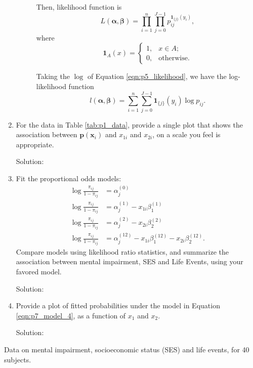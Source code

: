 \documentclass[letterpaper,11pt]{article}
\begin{document}
\begin{enumerate}
\begin{description}
    Then, likelihood function is
    \begin{equation}
      L\left(\bm\alpha, \bm\beta\right)
      = \prod_{i=1}^n \prod_{j=0}^{J-1} p_{ij}^{\mathbf{1}_{\{j\}}\left(y_i\right)},
      \label{eqn:p5_likelihood}
    \end{equation}
    where
    \begin{equation}
      \mathbf{1}_A\left(x\right) = \begin{cases}
        1,&x \in A; \\
        0,&\text{otherwise}.
      \end{cases}
      \label{eqn:p5_indicator}
    \end{equation}

    Taking the $\log$ of Equation \ref{eqn:p5_likelihood}, we have the
    log-likelihood function
    \begin{equation}
      l\left(\bm\alpha,\bm\beta\right)
      = \sum_{i=1}^n\sum_{j=0}^{J-1}\mathbf{1}_{\{j\}}\left(y_i\right) \log p_{ij}.
    \end{equation}    
  \end{description}
\item For the data in Table \ref{tab:p1_data}, provide a single plot that shows
  the association between $\mathbf{p}\left(\mathbf{x}_i\right)$ and $x_{1i}$ and
  $x_{2i}$, on a scale you feel is appropriate.
  \begin{description}
  \item[Solution:] 
  \end{description}
\item Fit the proportional odds models:
  \begin{align}
    \log\frac{\pi_{ij}}{1 - \pi_{ij}}
    &= \alpha_j^{(0)}
      \label{eqn:p7_model_1} \\
    \log\frac{\pi_{ij}}{1 - \pi_{ij}}
    &= \alpha_j^{(1)} - x_{1i}\beta_1^{(1)}
      \label{eqn:p7_model_2} \\
    \log\frac{\pi_{ij}}{1 - \pi_{ij}}
    &=  \alpha_j^{(2)} - x_{2i}\beta_2^{(2)}
      \label{eqn:p7_model_3} \\
    \log\frac{\pi_{ij}}{1 - \pi_{ij}}
    &= \alpha_j^{(12)} - x_{1i}\beta_1^{(12)} - x_{2i}\beta_2^{(12)}.
      \label{eqn:p7_model_4}
  \end{align}
  Compare models using likelihood ratio statistics, and summarize the
  association between mental impairment, SES and Life Events, using your favored
  model.
  
  \begin{description}
  \item[Solution:] 
  \end{description}
\item Provide a plot of fitted probabilities under the model in Equation
  \ref{eqn:p7_model_4}, as a function of $x_1$ and $x_2$.

  \begin{description}
  \item[Solution:] 
  \end{description}
\end{enumerate}
\begin{table}
  \small
  \centering
  
  \caption{Data on mental impairment, socioeconomic status (SES) and life
    events, for 40 subjects.}
  \label{tab:p1_data}
\end{table}
\end{document}
